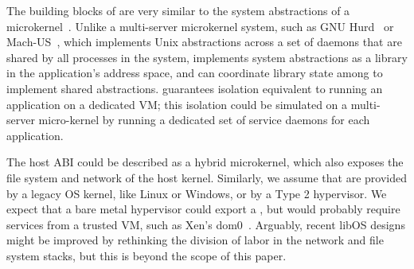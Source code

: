 \vspace{5pt}
The building blocks of \sysname{} are very similar to the system abstractions of a 
microkernel~\citep{liedtke95sosp,klein09sel4,elphinstone13microkernels,liedtke93sosp,chen93memory,Baron:1985:MOE,Accetta:1986:MNK}.
Unlike a multi-server microkernel system, such as GNU Hurd~\citep{hurd} or Mach-US~\citep{stevenson95mach-us},
which implements Unix abstractions across a set of daemons that are shared by all processes in the system,
\sysname{} implements system abstractions as a library in the application's address space,
and can coordinate library state among \picoprocs{} to implement shared abstractions.
\sysname{} guarantees isolation equivalent to running 
an application on a dedicated VM; this isolation could be simulated on a multi-server micro-kernel
by running a dedicated set of service daemons for each application.


The \sysname{} host ABI could be described as a hybrid microkernel,
which also exposes the file system and network of the host kernel.
Similarly, we assume that \picoprocs{} are provided by a legacy OS kernel, like Linux or Windows,
or by a Type 2 hypervisor.  We expect that a bare metal hypervisor could export a \pal{},
but would probably require services from a trusted VM, such as Xen's dom0~\citep{barham03xen}.
Arguably, recent libOS designs might be improved by rethinking the division of labor in
the network and file system stacks, but this is beyond the scope of this paper.


